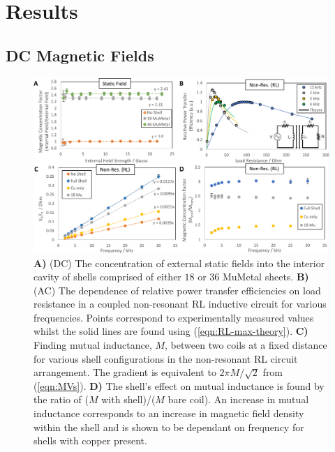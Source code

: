 \documentclass[11pt]{iopart}
\begin{document}
\section{Results}
\subsection{DC Magnetic Fields}

\begin{figure}
  \begin{center}
   \noindent\includegraphics[width=\linewidth]{images/compoundRL-inset.pdf}
  \end{center}
  \caption{
    \textbf{A)} (DC) The concentration of external static fields into
    the interior cavity of shells comprised of either $18$ or $36$
    MuMetal sheets.
    \textbf{B)} (AC) The dependence of relative power transfer
    efficiencies on load resistance in a coupled non-resonant RL
    inductive circuit for various frequencies. Points correspond to
    experimentally measured values whilst the solid lines are found
    using (\ref{eqn:RL-max-theory}).
    \textbf{C)} Finding mutual inductance, $M$, between two coils at a
    fixed distance for various shell configurations in the non-resonant RL circuit
    arrangement.  The gradient is equivalent to $2\pi M/\sqrt{2}$
    from (\ref{eqn:MVs}).
    \textbf{D)} The shell's effect on mutual inductance is found by the
    ratio of ($M$ with shell)/($M$ bare coil). An increase in mutual
    inductance corresponds to an increase in magnetic field density
    within the shell and is shown to be dependant on frequency for
    shells with copper present.}
  \label{fig:DC_RL}
\end{figure}
\end{document}
